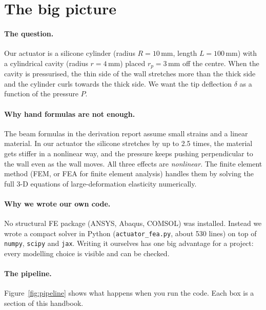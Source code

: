 \documentclass[11pt,a4paper]{article}
\numberwithin{equation}{section}
\begin{document}
\tableofcontents
\newpage

\section{The big picture}

\paragraph{The question.}
Our actuator is a silicone cylinder (radius $R=10$\,mm, length $L=100$\,mm) with a
cylindrical cavity (radius $r=4$\,mm) placed $r_p=3$\,mm off the centre. When the
cavity is pressurised, the thin side of the wall stretches more than the thick side
and the cylinder curls towards the thick side. We want the tip deflection $\delta$
as a function of the pressure $P$.

\paragraph{Why hand formulas are not enough.}
The beam formulas in the derivation report assume small strains and a linear
material. In our actuator the silicone stretches by up to 2.5 times, the material
gets stiffer in a nonlinear way, and the pressure keeps pushing perpendicular to the
wall even as the wall moves. All three effects are \emph{nonlinear}. The finite
element method (FEM, or FEA for finite element analysis) handles them by solving
the full 3-D equations of large-deformation elasticity numerically.

\paragraph{Why we wrote our own code.}
No structural FE package (ANSYS, Abaqus, COMSOL) was installed. Instead we wrote a
compact solver in Python (\texttt{actuator\_fea.py}, about 530 lines) on top of
\texttt{numpy}, \texttt{scipy} and \texttt{jax}. Writing it ourselves has one big
advantage for a project: every modelling choice is visible and can be checked.

\paragraph{The pipeline.}
Figure~\ref{fig:pipeline} shows what happens when you run the code. Each box is a
section of this handbook.
\end{document}
